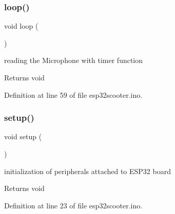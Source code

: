 \subsubsection{\texorpdfstring{loop()}{loop()}}
{\footnotesize\ttfamily void loop (\begin{DoxyParamCaption}{ }\end{DoxyParamCaption})}



reading the Microphone with timer function 

\begin{DoxyReturn}{Returns}
void 
\end{DoxyReturn}


Definition at line 59 of file esp32scooter.\+ino.

\mbox{\label{esp32scooter_8ino_a4fc01d736fe50cf5b977f755b675f11d}} 
\subsubsection{\texorpdfstring{setup()}{setup()}}
{\footnotesize\ttfamily void setup (\begin{DoxyParamCaption}{ }\end{DoxyParamCaption})}



initialization of peripherals attached to E\+S\+P32 board 

\begin{DoxyReturn}{Returns}
void 
\end{DoxyReturn}


Definition at line 23 of file esp32scooter.\+ino.

